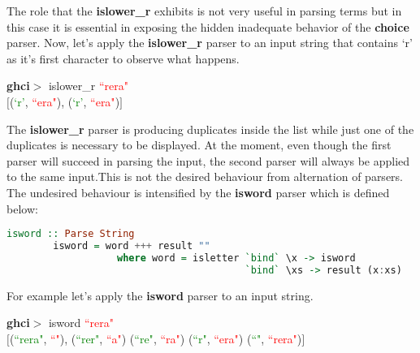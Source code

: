\documentclass[a4paper, onecolumn]{article}
\begin{document}
    \noindent The role that the \textbf{islower\_r} exhibits is not very useful in parsing terms but in this case it is essential in exposing the hidden inadequate behavior of the \textbf{choice} parser. Now, let's apply the \textbf{islower\_r} parser to an input string that contains `r' as it's first character to observe what happens.
    
    \begin{center}
            \textbf{ghci$>$} islower\_r \textcolor{red}{``rera"} \\
            $\big[$(\textcolor{green}{`r'}, \textcolor{red}{``era"}), (\textcolor{green}{`r'}, \textcolor{red}{``era"})$\big]$
        \end{center}
    
     \noindent The \textbf{islower\_r} parser is producing duplicates inside the list while just one of the duplicates is necessary to be displayed. At the moment, even though the first parser will succeed in parsing the input, the second parser will always be applied to the same input.This is not the desired behaviour from alternation of parsers. The undesired behaviour is intensified by the \textbf{isword} parser which is defined below:
     
    \begin{tcolorbox}
    \begin{lstlisting}[language=Haskell] 
        isword :: Parse String
        isword = word +++ result ""
                   where word = isletter `bind` \x -> isword 
                                         `bind` \xs -> result (x:xs)
    \end{lstlisting}
    \end{tcolorbox}
    
    \noindent For example let's apply the \textbf{isword} parser to an input string.
    
    \begin{center}
            \textbf{ghci$>$} isword \textcolor{red}{``rera"} \\
               $\big[$(\textcolor{green}{``rera"}, \textcolor{red}{``"}), (\textcolor{green}{``rer"}, \textcolor{red}{``a"})
            (\textcolor{green}{``re"}, \textcolor{red}{``ra"})
            (\textcolor{green}{``r"}, \textcolor{red}{``era"})
            (\textcolor{green}{``"}, \textcolor{red}{``rera"})$\big]$
        \end{center}
        
\end{document}
